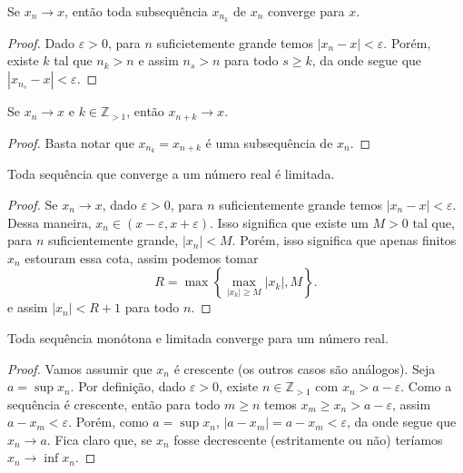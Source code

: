 \begin{theorem}
    Se $x_n \to x$, então toda subsequência $x_{n_k}$ de $x_n$ converge para $x$.
\end{theorem}
\begin{proof}
    Dado $\varepsilon > 0$, para $n$ suficietemente grande temos $|x_n - x| < \varepsilon$. Porém, existe $k$ tal que $n_k > n$ e assim $n_s > n$ para todo $s \geq k$, da onde segue que $|x_{n_s} - x| < \varepsilon$.
\end{proof}

\begin{corollary}
    Se $x_n \to x$ e $k \in \mathbb{Z}_{>1}$, então $x_{n + k} \to x$.
\end{corollary}
\begin{proof}
    Basta notar que $x_{n_k} = x_{n + k}$ é uma subsequência de $x_n$.
\end{proof}

\begin{theorem}
    Toda sequência que converge a um número real é limitada.
\end{theorem}
\begin{proof}
    Se $x_n \to x$, dado $\varepsilon > 0$, para $n$ suficientemente grande temos $|x_n - x| < \varepsilon$. Dessa maneira, $x_n \in (x - \varepsilon, x + \varepsilon)$. Isso significa que existe um $M > 0$ tal que, para $n$ suficientemente grande, $|x_n| < M$. Porém, isso significa que apenas finitos $x_n$ estouram essa cota, assim podemos tomar \begin{equation}
        R = \max\left\{\max_{|x_k| \geq M} |x_k|, M\right\}.
    \end{equation} e assim $|x_n| < R+1$ para todo $n$.
\end{proof}

\begin{theorem}
    Toda sequência monótona e limitada converge para um número real.
\end{theorem}
\begin{proof}
    Vamos assumir que $x_n$ é crescente (os outros casos são análogos). Seja $a = \sup x_n$. Por definição, dado $\varepsilon > 0$, existe $n \in \mathbb{Z}_{>1}$ com $x_n > a - \varepsilon$. Como a sequência é crescente, então para todo $m \geq n$ temos $x_m \geq x_n > a - \varepsilon$, assim $a - x_m < \varepsilon$. Porém, como $a = \sup x_n$, $|a - x_m| = a - x_m < \varepsilon$, da onde segue que $x_n \to a$. Fica claro que, se $x_n$ fosse decrescente (estritamente ou não) teríamos $x_n \to \inf x_n$.
\end{proof}

